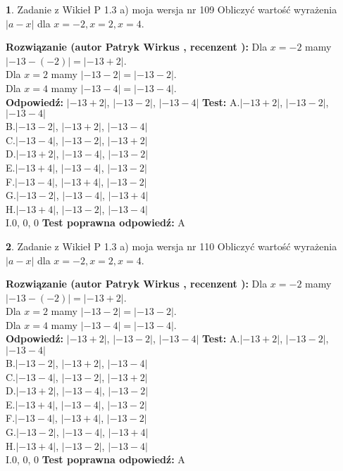 \documentclass[12pt, a4paper]{article}
\theoremstyle{definition} %
\newtheorem{zad}{}
\newcommand{\zadStart}[1]{\begin{zad}#1\newline}
\newcommand{\zadStop}{\end{zad}}
\newcommand{\rozwStart}[2]{\noindent \textbf{Rozwiązanie (autor #1 , recenzent #2): }\newline}
\newcommand{\rozwStop}{\newline}
\newcommand{\odpStart}{\noindent \textbf{Odpowiedź:}\newline}
\newcommand{\odpStop}{\newline}
\newcommand{\testStart}{\noindent \textbf{Test:}\newline}
\newcommand{\testStop}{\newline}
\newcommand{\kluczStart}{\noindent \textbf{Test poprawna odpowiedź:}\newline}
\newcommand{\kluczStop}{\newline}
\begin{document}
\zadStart{Zadanie z Wikieł P 1.3 a) moja wersja nr 109}
Obliczyć wartość wyrażenia $|a - x|$ dla $x=-2,x=2,x=4$.
\zadStop
\rozwStart{Patryk Wirkus}{}
Dla $x = -2$ mamy $|-13 - (-2)| = |-13 + 2|$.\\
Dla $x = 2$ mamy $|-13 - 2| = |-13 - 2|$.\\
Dla $x = 4$ mamy $|-13 - 4| = |-13 - 4|$.\\
\rozwStop
\odpStart
$|-13 + 2|$, $|-13 - 2|$, $|-13 - 4|$
\odpStop
\testStart
A.$|-13 + 2|$, $|-13 - 2|$, $|-13 - 4|$\\
B.$|-13 - 2|$, $|-13 + 2|$, $|-13 - 4|$\\
C.$|-13 - 4|$, $|-13 - 2|$, $|-13 + 2|$\\
D.$|-13 + 2|$, $|-13 - 4|$, $|-13 - 2|$\\
E.$|-13 + 4|$, $|-13 - 4|$, $|-13 - 2|$\\
F.$|-13 - 4|$, $|-13 + 4|$, $|-13 - 2|$\\
G.$|-13 - 2|$, $|-13 - 4|$, $|-13 + 4|$\\
H.$|-13 + 4|$, $|-13 - 2|$, $|-13 - 4|$\\
I.$0$, $0$, $0$
\testStop
\kluczStart
A
\kluczStop



\zadStart{Zadanie z Wikieł P 1.3 a) moja wersja nr 110}
Obliczyć wartość wyrażenia $|a - x|$ dla $x=-2,x=2,x=4$.
\zadStop
\rozwStart{Patryk Wirkus}{}
Dla $x = -2$ mamy $|-13 - (-2)| = |-13 + 2|$.\\
Dla $x = 2$ mamy $|-13 - 2| = |-13 - 2|$.\\
Dla $x = 4$ mamy $|-13 - 4| = |-13 - 4|$.\\
\rozwStop
\odpStart
$|-13 + 2|$, $|-13 - 2|$, $|-13 - 4|$
\odpStop
\testStart
A.$|-13 + 2|$, $|-13 - 2|$, $|-13 - 4|$\\
B.$|-13 - 2|$, $|-13 + 2|$, $|-13 - 4|$\\
C.$|-13 - 4|$, $|-13 - 2|$, $|-13 + 2|$\\
D.$|-13 + 2|$, $|-13 - 4|$, $|-13 - 2|$\\
E.$|-13 + 4|$, $|-13 - 4|$, $|-13 - 2|$\\
F.$|-13 - 4|$, $|-13 + 4|$, $|-13 - 2|$\\
G.$|-13 - 2|$, $|-13 - 4|$, $|-13 + 4|$\\
H.$|-13 + 4|$, $|-13 - 2|$, $|-13 - 4|$\\
I.$0$, $0$, $0$
\testStop
\kluczStart
A
\kluczStop
\end{document}
